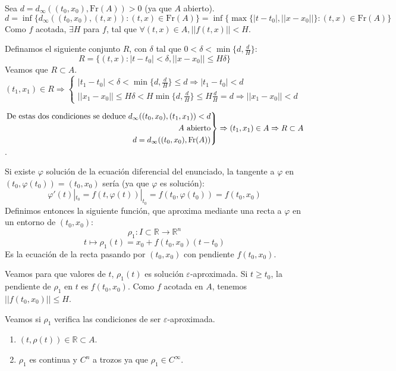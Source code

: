 \documentclass{article}
\makeatletter
\newenvironment{rcases}
{\left.\begin{aligned}}
	{\end{aligned}\right\rbrace}
\theoremstyle{theorem-style}  %
\theoremstyle{definition-style}
\theoremstyle{example-style}
\renewenvironment{proof}[1][\proofname]{\par
	\pushQED{\qed}%
	\normalfont \topsep6\p@\@plus6\p@\relax
	\list{}{%
		\settowidth{\leftmargin}{\quad:\hskip\labelsep}%
		\setlength{\labelwidth}{0pt}%
		\setlength{\itemindent}{-\leftmargin}%
	}%
	\item[\hskip\labelsep\itshape#1\@addpunct{:}]\ignorespaces
}{%
	\popQED\endlist\@endpefalse
}
\makeatother
\begin{document}
\begin{proof}
	Sea $ d=d_\infty((t_0, x_0), \text{Fr} (A))>0 $ (ya que $ A $ abierto).
	\[ d=\inf \{d_\infty ( (t_0,x_0), (t,x)):(t,x)\in \text{Fr} (A) \}=\inf \{\max \{|t-t_0|,||x-x_0||\}:(t,x)\in \text{Fr} (A)\}\]
	Como $ f $ acotada, $ \exists H $ para $ f $, tal que $ \forall(t,x) \in A, ||f(t,x)||<H $.
	
	Definamos el siguiente conjunto $ R $, con $ \delta $ tal que $ 0<\delta<\min \{d, \frac{d}{H}\} $:
	\[ R=\{(t,x):|t-t_0|<\delta, ||x-x_0||\leq H\delta\} \]
	Veamos que $ R \subset A $. $ (t_1,x_1)\in R \Rightarrow \begin{cases}
	|t_1-t_0|<\delta<\min\{d,\frac{d}{H}\}\leq d\Rightarrow |t_1-t_0|<d\\
	||x_1-x_0||\leq H\delta<H\min\{d,\frac{d}{H}\}\leq H \frac{d}{H}=d \Rightarrow ||x_1-x_0||<d
	\end{cases}$  
	
	$\begin{rcases}
	\text{De estas dos condiciones se deduce } d_\infty ( (t_0,x_0), (t_1,x_1)) <d\\
	A \text{ abierto}\\
	d=d_\infty((t_0, x_0), \text{Fr} (A))
	\end{rcases} \Rightarrow (t_1,x_1)\in A \Rightarrow R \subset A$.
	
	Si existe $ \varphi $ solución de la ecuación diferencial del enunciado, la tangente a $ \varphi $ en $ (t_0,\varphi(t_0))=(t_0,x_0) $ sería (ya que $ \varphi $ es solución):
	\[ \varphi'(t)|_{t_0}=f(t, \varphi(t))|_{t_0}=f(t_0,\varphi (t_0))=f(t_0,x_0) \]
	Definimos entonces la siguiente función, que aproxima mediante una recta a $ \varphi $ en un entorno de $ (t_0,x_0) $: 
	\[ \rho_1:I\subset \mathbb{R}\longrightarrow \mathbb{R}^n \]
	\[ t \mapsto \rho_1(t)=x_0+f(t_0,x_0)(t-t_0) \]
	Es la ecuación de la recta pasando por $ (t_0,x_0) $ con pendiente $ f(t_0,x_0) $.
	
	Veamos para que valores de $ t $, $ \rho_1(t) $ es solución $ \varepsilon $-aproximada. 
	Si $ t\geq t_0 $, la pendiente de $ \rho_1 $ en $ t $ es $ f(t_0,x_0) $.
	Como $ f $ acotada en $ A $, tenemos $ ||f(t_0,x_0)||\leq H $.
	
	Veamos si $ \rho_1 $ verifica las condiciones de ser $ \varepsilon $-aproximada.
	\begin{enumerate}[\qquad i)]
		\item  $ (t,\rho(t)) \in \mathbb{R}\subset A$.
		
		\item $ \rho_1 $ es continua y $ C^n $ a trozos ya que $ \rho_1 \in C^\infty $.
		

\end{enumerate}
\end{proof}
\end{document}

